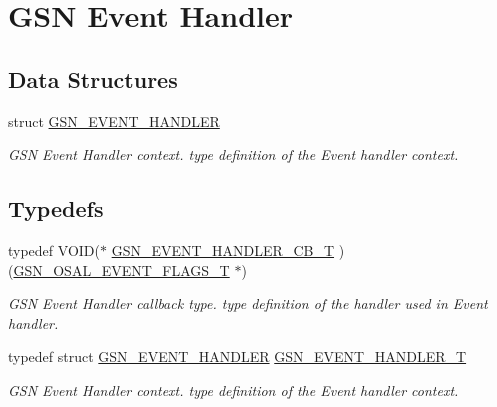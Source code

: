 \hypertarget{a00622}{
\section{GSN Event Handler}
\label{a00622}
}
\subsection*{Data Structures}
\begin{DoxyCompactItemize}
\item 
struct \hyperlink{a00069}{GSN\_\-EVENT\_\-HANDLER}
\begin{DoxyCompactList}\small\item\em GSN Event Handler context. type definition of the Event handler context. \end{DoxyCompactList}\end{DoxyCompactItemize}
\subsection*{Typedefs}
\begin{DoxyCompactItemize}
\item 
typedef VOID($\ast$ \hyperlink{a00622_ga570a795e4730bcaa1c17b58223336526}{GSN\_\-EVENT\_\-HANDLER\_\-CB\_\-T} )(\hyperlink{a00628_gab93fdfc637101a29260ca105d3eb924e}{GSN\_\-OSAL\_\-EVENT\_\-FLAGS\_\-T} $\ast$)
\begin{DoxyCompactList}\small\item\em GSN Event Handler callback type. type definition of the handler used in Event handler. \end{DoxyCompactList}\item 
typedef struct \hyperlink{a00069}{GSN\_\-EVENT\_\-HANDLER} \hyperlink{a00622_ga6b24ca227651d8ca08bb5e95b709dc49}{GSN\_\-EVENT\_\-HANDLER\_\-T}
\begin{DoxyCompactList}\small\item\em GSN Event Handler context. type definition of the Event handler context. \end{DoxyCompactList}\end{DoxyCompactItemize}
